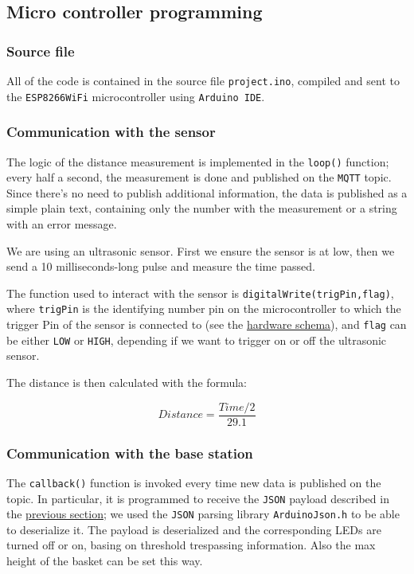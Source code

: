 \documentclass{article}
\begin{document}
\subsection{Micro controller programming}

\subsubsection{Source file}

All of the code is contained in the source file \texttt{project.ino}, compiled
and sent to the \texttt{ESP8266WiFi} microcontroller using \texttt{Arduino IDE}.

\subsubsection{Communication with the sensor}

The logic of the distance measurement is implemented in the \verb|loop()|
function; every half a second, the measurement is done and published on the
\texttt{MQTT} topic. Since there's no need to publish additional information, the
data is published as a simple plain text, containing only the number with the
measurement or a string with an error message.

We are using an ultrasonic sensor. First we ensure the sensor is at low, then we
send a 10 milliseconds-long pulse and measure the time passed.

The function used to interact with the sensor is
\verb|digitalWrite(trigPin,flag)|,
where \texttt{trigPin} is the identifying number pin on the
microcontroller to which the trigger Pin of the sensor is connected to (see the
\hyperref[schema_bb]{hardware schema}), and
\texttt{flag} can be either \texttt{LOW} or \texttt{HIGH}, depending if we want
to trigger on or off the ultrasonic sensor.

The distance is then calculated with the formula:

\begin{equation}
\mathit{Distance} = \frac{\mathit{Time}/2}{29.1}
\end{equation}

\subsubsection{Communication with the base station}

The \verb|callback()| function is invoked every time new data is published on
the topic. In particular, it is programmed to receive the \texttt{JSON} payload
described in the \hyperref[sec:json]{previous section}; we used the
\texttt{JSON} parsing library \texttt{ArduinoJson.h} to be able to deserialize
it. The payload is deserialized and the corresponding LEDs are turned off or on,
basing on threshold trespassing information. Also the max height of the basket
can be set this way.
\end{document}
